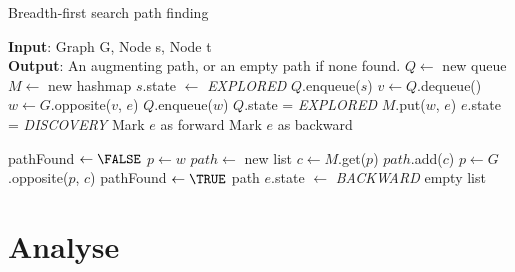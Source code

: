 \begin{algorithm}
 \caption{Breadth-first search path finding}
 \label{alg:breadthfirst}
 \begin{algorithmic}
  \REQUIRE \textbf{Input}: Graph G, Node s, Node t \\ 
\textbf{Output}: An augmenting path, or an empty path if none found.
  \STATE $Q \gets $ new queue
  \STATE $M \gets $ new hashmap
  \STATE $s$.state $\gets$ \textit{EXPLORED}
  \STATE $Q$.enqueue($s$)
   \STATE $v \gets Q$.dequeue()
    \STATE $w \gets G$.opposite($v$, $e$)
      \STATE $Q$.enqueue($w$)
      \STATE $Q$.state = \textit{EXPLORED}
      \STATE $M$.put($w$, $e$) 
      \STATE $e$.state = \textit{DISCOVERY}
         \STATE Mark $e$ as forward
      \ELSE
         \STATE Mark $e$ as backward
      \ENDIF

         \STATE pathFound $\gets \FALSE$
         \STATE $p \gets w$
         \STATE $path \gets $ new list
          \STATE $c \gets M$.get($p$) 
          \STATE $path$.add($c$)      
          \STATE $p \gets G$.opposite($p$, $c$) 
            \STATE pathFound $\gets \TRUE$ 
          \ENDIF
         \ENDWHILE
         \RETURN path
      \ENDIF
    \ENDIF
    \ELSE
      \STATE $e$.state $\gets$ \textit{BACKWARD}
    \ENDIF
   \ENDFOR
  \ENDWHILE
  \RETURN empty list 
 \end{algorithmic}
\end{algorithm}

\section{Analyse}